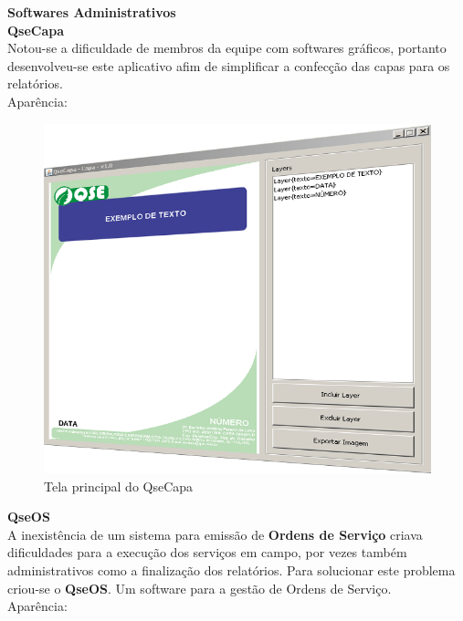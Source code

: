 \documentclass[12pt,a4paper,oneside,sumario=tradicional,brazil]{abntex2}
\begin{document}
\textbf{{\Large Softwares Administrativos}} \\
\indent
\textbf{{\large QseCapa}} \\
\indent
Notou-se a dificuldade de membros da equipe com softwares gráficos, portanto desenvolveu-se este aplicativo afim de simplificar a confecção das capas para os relatórios. \\
\indent
Aparência: \\
\begin{figure}[H]
	\centering
	\includegraphics[width=0.4\linewidth]{imgs/QseCapa-aparencia-perspectiva.png}
	\caption{Tela principal do QseCapa}
\end{figure}
\indent
\textbf{{\large QseOS}} \\
\indent
A inexistência de um sistema para emissão de \textbf{Ordens de Serviço} criava dificuldades para a execução dos serviços em campo, por vezes também administrativos como a finalização dos relatórios. Para solucionar este problema criou-se o \textbf{QseOS}. Um software para a gestão de Ordens de Serviço. \\
\indent
Aparência: \\
\end{document}

